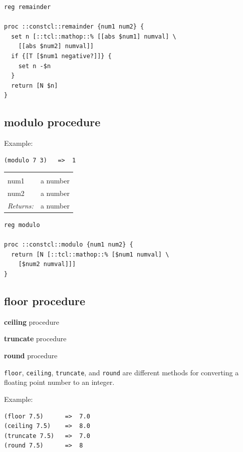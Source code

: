 \documentclass[a5paper,draft]{memoir}
\begin{document}
\begin{lstlisting}
reg remainder

proc ::constcl::remainder {num1 num2} {
  set n [::tcl::mathop::% [[abs $num1] numval] \
    [[abs $num2] numval]]
  if {[T [$num1 negative?]]} {
    set n -$n
  }
  return [N $n]
}
\end{lstlisting}

\subsection{modulo procedure}
\label{modulo-procedure}

Example:

\begin{verbatim}
(modulo 7 3)   =>  1
\end{verbatim}

\noindent\begin{tabular}{ |p{1.9cm} p{6.5cm}| }
\hline
\rowcolor[HTML]{CCCCCC} \multicolumn{2}{|l|}{\textbf{modulo (public)}} \\
num1 & a number \\
num2 & a number \\
\textit{Returns:} & a number \\
\hline
\end{tabular}

\begin{lstlisting}
reg modulo

proc ::constcl::modulo {num1 num2} {
  return [N [::tcl::mathop::% [$num1 numval] \
    [$num2 numval]]]
}
\end{lstlisting}

\subsection{floor procedure}
\label{floor-procedure}

\noindent \textbf{ceiling} procedure

\noindent \textbf{truncate} procedure

\noindent \textbf{round} procedure

\texttt{floor}, \texttt{ceiling}, \texttt{truncate}, and \texttt{round} are different methods for converting a floating point number to an integer.

Example:

\begin{verbatim}
(floor 7.5)      =>  7.0
(ceiling 7.5)    =>  8.0
(truncate 7.5)   =>  7.0
(round 7.5)      =>  8
\end{verbatim}
\end{document}

